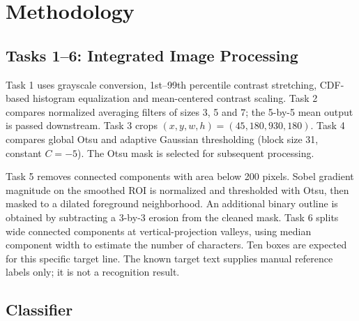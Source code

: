 \documentclass[11pt,a4paper]{article}
\begin{document}
\section{Methodology}

\subsection{Tasks 1--6: Integrated Image Processing}
Task 1 uses grayscale conversion, 1st--99th percentile contrast stretching,
CDF-based histogram equalization and mean-centered contrast scaling.
Task 2 compares normalized averaging filters of sizes 3, 5 and 7; the
5-by-5 mean output is passed downstream. Task 3 crops
$(x,y,w,h)=(45,180,930,180)$. Task 4 compares global Otsu and adaptive
Gaussian thresholding (block size 31, constant $C=-5$). The Otsu mask
is selected for subsequent processing.

Task 5 removes connected components with area below 200 pixels. Sobel
gradient magnitude on the smoothed ROI is normalized and thresholded
with Otsu, then masked to a dilated foreground neighborhood. An additional
binary outline is obtained by subtracting a 3-by-3 erosion from the cleaned
mask. Task 6 splits wide connected components at vertical-projection
valleys, using median component width to estimate the number of characters.
Ten boxes are expected for this specific target line. The known target
text supplies manual reference labels only; it is not a recognition result.

\begin{center}
\end{center}

\subsection{Classifier}
\end{document}
